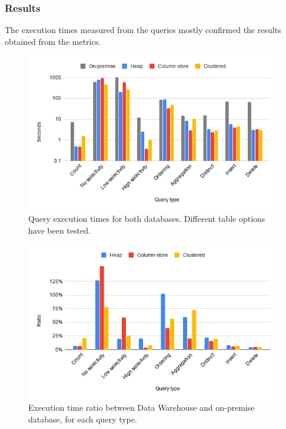 \subsubsection{Results}
    The execution times measured from the queries mostly confirmed the results obtained from the metrics.

    \begin{figure}[p]
        \centering
        \includegraphics[width=\textwidth]{res/tests/perf_queries.png}
        \caption{Query execution times for both databases. Different table options have been tested.}
        \label{fig:tests:perf:queries:results}
    \end{figure}
    
    \begin{figure}[p]
        \centering
        \includegraphics[width=\textwidth]{res/tests/perf_queries_perc.png}
        \caption{Execution time ratio between Data Warehouse and on-premise database, for each query type.}
        \label{fig:tests:perf:queries:results:ratio}
    \end{figure}
    
